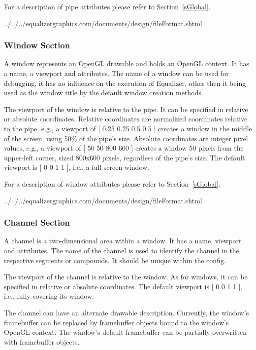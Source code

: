 \documentclass[10pt,a4]{scrartcl}
\newcommand{\sref}[1]{Section~\ref{#1}}
\begin{document}
For a description of pipe attributes please refer to \sref{sGlobal}.

{\footnotesize
  {../../../equalizergraphics.com/documents/design/fileFormat.shtml}}

\subsubsection{Window Section}

A window represents an OpenGL drawable and holds an OpenGL context. It
has a name, a viewport and attributes. The name of a window can be used
for debugging, it has no influence on the execution of Equalizer, other
then it being used as the window title by the default window creation
methods.

The viewport of the window is relative to the pipe. It can be specified in
relative or absolute coordinates. Relative coordinates are normalized
coordinates relative to the pipe, e.g., a viewport of \textsf{[ 0.25 0.25 0.5
    0.5 ]} creates a window in the middle of the screen, using 50\% of the
pipe's size. Absolute coordinates are integer pixel values, e.g., a viewport of
\textsf{[ 50 50 800 600 ]} creates a window 50 pixels from the upper-left
corner, sized 800x600 pixels, regardless of the pipe's size. The default
viewport is \textsf{[ 0 0 1 1 ]}, i.e., a full-screen window.

For a description of window attributes please refer to \sref{sGlobal}.

{\footnotesize
  {../../../equalizergraphics.com/documents/design/fileFormat.shtml}}

\subsubsection{Channel Section}

A channel is a two-dimensional area within a window. It has a name,
viewport and attributes. The name of the channel is used to identify the
channel in the respective segments or compounds. It should be unique
within the config.

The viewport of the channel is relative to the window. As for windows,
it can be specified in relative or absolute coordinates. The default
viewport is \textsf{[ 0 0 1 1 ]}, i.e., fully covering its window.

The channel can have an alternate drawable description. Currently, the
window's framebuffer can be replaced by framebuffer objects bound to the
window's OpenGL context. The window's default framebuffer can be
partially overwritten with framebuffer objects.
\end{document}
